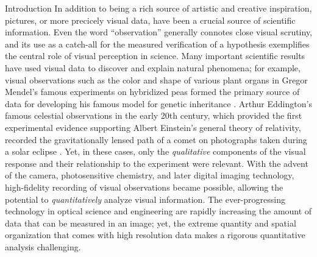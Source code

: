\setlength{\parindent}{2ex}
\begin{chapter}{Introduction}\label{chapter:introduction}
  In addition to being a rich source of artistic and creative inspiration, pictures, or more precicely visual data, have been a crucial source of scientific information.
  Even the word ``observation'' generally connotes close visual scrutiny, and its use as a catch-all for the measured verification of a hypothesis exemplifies the central role of visual perception in science.
  Many important scientific results have used visual data to discover and explain natural phenomena; for example, visual observations such as the color and shape of various plant organs in Gregor Mendel's famous experiments on hybridized peas formed the primary source of data for developing his famous model for genetic inheritance \citep{magner2002}.
  Arthur Eddington's famous celestial observations in the early 20th century, which provided the first experimental evidence supporting Albert Einstein's general theory of relativity, recorded the gravitationally lensed path of a comet on photographs taken during a solar eclipse \citep{eddington1920}.
  Yet, in these cases, only the \emph{qualitative} components of the visual response and their relationship to the experiment were relevant.
  With the advent of the camera, photosensitive chemistry, and later digital imaging technology, high-fidelity recording of visual observations became possible, allowing the potential to \emph{quantitatively} analyze visual information.
  The ever-progressing technology in optical science and engineering are rapidly increasing the amount of data that can be measured in an image; yet, the extreme quantity and spatial organization that comes with high resolution data makes a rigorous quantitative analysis challenging.


\end{chapter}
